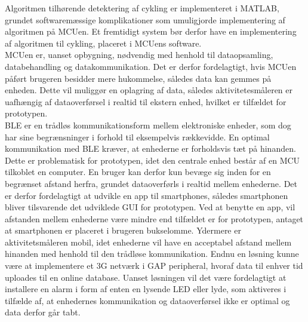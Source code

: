 Algoritmen tilhørende detektering af cykling er implementeret i MATLAB, grundet softwaremæssige komplikationer som umuligjorde implementering af algoritmen på MCUen. Et fremtidigt system bør derfor have en implementering af algoritmen til cykling, placeret i MCUens software. \\ %
MCUen er, uanset opbygning, nødvendig med henhold til dataopsamling, databehandling og datakommunikation. Det er derfor fordelagtigt, hvis MCUen påført brugeren besidder mere hukommelse, således data kan gemmes på enheden. Dette vil muliggør en oplagring af data, således aktivitetesmåleren er uafhængig af dataoverførsel i realtid til ekstern enhed, hvilket er tilfældet for prototypen. \\
BLE er en trådløs kommunikationsform mellem elektroniske enheder, som dog har sine begrænsninger i forhold til eksempelvis rækkevidde. En optimal kommunikation med BLE kræver, at enhederne er forholdsvis tæt på hinanden. Dette er problematisk for prototypen, idet den centrale enhed består af en MCU tilkoblet en computer. En bruger kan derfor kun bevæge sig inden for en begrænset afstand herfra, grundet dataoverførls i realtid mellem enhederne. Det er derfor fordelagtigt at udvikle en app til smartphones, således smartphonen bliver tilsvarende det udviklede GUI for prototypen. Ved at benytte en app, vil afstanden mellem enhederne være mindre end tilfældet er for prototypen, antaget at smartphonen er placeret i brugeren bukselomme. Ydermere er aktivitetsmåleren mobil, idet enhederne vil have en acceptabel afstand mellem hinanden med henhold til den trådløse kommunikation. Endnu en løsning kunne være at implementere et 3G netværk i GAP peripheral, hvoraf data til enhver tid uploades til en online database. Uanset løsningen vil det være fordelagtigt at installere en alarm i form af enten en lysende LED eller lyde, som aktiveres i tilfælde af, at enhedernes kommunikation og dataoverførsel ikke er optimal og data derfor går tabt. 

